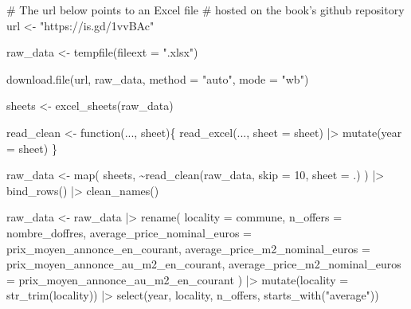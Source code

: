 \documentclass[
  letterpaper,
  DIV=11,
  numbers=noendperiod]{scrartcl}
\newenvironment{Shaded}{\begin{snugshade}}{\end{snugshade}}
\newcommand{\AttributeTok}[1]{\textcolor[rgb]{0.40,0.45,0.13}{#1}}
\newcommand{\CommentTok}[1]{\textcolor[rgb]{0.37,0.37,0.37}{#1}}
\newcommand{\ControlFlowTok}[1]{\textcolor[rgb]{0.00,0.23,0.31}{#1}}
\newcommand{\DecValTok}[1]{\textcolor[rgb]{0.68,0.00,0.00}{#1}}
\newcommand{\FunctionTok}[1]{\textcolor[rgb]{0.28,0.35,0.67}{#1}}
\newcommand{\NormalTok}[1]{\textcolor[rgb]{0.00,0.23,0.31}{#1}}
\newcommand{\OtherTok}[1]{\textcolor[rgb]{0.00,0.23,0.31}{#1}}
\newcommand{\SpecialCharTok}[1]{\textcolor[rgb]{0.37,0.37,0.37}{#1}}
\newcommand{\StringTok}[1]{\textcolor[rgb]{0.13,0.47,0.30}{#1}}
\begin{document}
\begin{Shaded}
\begin{Highlighting}[]
\CommentTok{\# The url below points to an Excel file}
\CommentTok{\# hosted on the book’s github repository}
\NormalTok{url }\OtherTok{\textless{}{-}} \StringTok{"https://is.gd/1vvBAc"}

\NormalTok{raw\_data }\OtherTok{\textless{}{-}} \FunctionTok{tempfile}\NormalTok{(}\AttributeTok{fileext =} \StringTok{".xlsx"}\NormalTok{)}

\FunctionTok{download.file}\NormalTok{(url, raw\_data,}
              \AttributeTok{method =} \StringTok{"auto"}\NormalTok{,}
              \AttributeTok{mode =} \StringTok{"wb"}\NormalTok{)}

\NormalTok{sheets }\OtherTok{\textless{}{-}} \FunctionTok{excel\_sheets}\NormalTok{(raw\_data)}

\NormalTok{read\_clean }\OtherTok{\textless{}{-}} \ControlFlowTok{function}\NormalTok{(..., sheet)\{}
  \FunctionTok{read\_excel}\NormalTok{(..., }\AttributeTok{sheet =}\NormalTok{ sheet) }\SpecialCharTok{|\textgreater{}}
    \FunctionTok{mutate}\NormalTok{(}\AttributeTok{year =}\NormalTok{ sheet)}
\NormalTok{\}}

\NormalTok{raw\_data }\OtherTok{\textless{}{-}} \FunctionTok{map}\NormalTok{(}
\NormalTok{  sheets,}
  \SpecialCharTok{\textasciitilde{}}\FunctionTok{read\_clean}\NormalTok{(raw\_data,}
              \AttributeTok{skip =} \DecValTok{10}\NormalTok{,}
              \AttributeTok{sheet =}\NormalTok{ .)}
\NormalTok{                   ) }\SpecialCharTok{|\textgreater{}}
  \FunctionTok{bind\_rows}\NormalTok{() }\SpecialCharTok{|\textgreater{}}
  \FunctionTok{clean\_names}\NormalTok{()}

\NormalTok{raw\_data }\OtherTok{\textless{}{-}}\NormalTok{ raw\_data }\SpecialCharTok{|\textgreater{}}
  \FunctionTok{rename}\NormalTok{(}
    \AttributeTok{locality =}\NormalTok{ commune,}
    \AttributeTok{n\_offers =}\NormalTok{ nombre\_doffres,}
    \AttributeTok{average\_price\_nominal\_euros =}\NormalTok{ prix\_moyen\_annonce\_en\_courant,}
    \AttributeTok{average\_price\_m2\_nominal\_euros =}\NormalTok{ prix\_moyen\_annonce\_au\_m2\_en\_courant,}
    \AttributeTok{average\_price\_m2\_nominal\_euros =}\NormalTok{ prix\_moyen\_annonce\_au\_m2\_en\_courant}
\NormalTok{  ) }\SpecialCharTok{|\textgreater{}}
  \FunctionTok{mutate}\NormalTok{(}\AttributeTok{locality =} \FunctionTok{str\_trim}\NormalTok{(locality)) }\SpecialCharTok{|\textgreater{}}
  \FunctionTok{select}\NormalTok{(year, locality, n\_offers, }\FunctionTok{starts\_with}\NormalTok{(}\StringTok{"average"}\NormalTok{))}
\end{Highlighting}
\end{Shaded}
\end{document}
